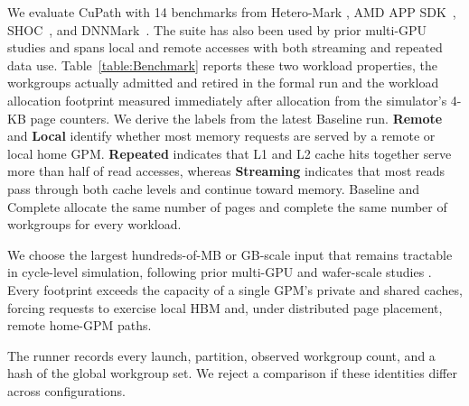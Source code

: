 We evaluate CuPath with 14 benchmarks from Hetero-Mark
\cite{sun2016hetero}, AMD APP SDK~\cite{amd_opencl_guide},
SHOC~\cite{danalis2010scalable}, and DNNMark~\cite{dong2017dnnmark}.
The suite has also been used by prior multi-GPU studies
\cite{wang2025oasis,li2023idyll,li2021improving,feng2024barre} and spans
local and remote accesses with both streaming and repeated data use.
Table~\ref{table:Benchmark} reports these two workload properties, the
workgroups actually admitted and retired in the formal run and the workload
allocation footprint measured immediately after allocation from the
simulator's 4-KB page counters.  We derive the labels from the latest Baseline
run.  \textbf{Remote} and \textbf{Local} identify whether most memory requests
are served by a remote or local home GPM.  \textbf{Repeated} indicates that L1
and L2 cache hits together serve more than half of read accesses, whereas
\textbf{Streaming} indicates that most reads pass through both cache levels
and continue toward memory.  Baseline and Complete allocate the same number of
pages and complete the same number of workgroups for every workload.

We choose the largest hundreds-of-MB or GB-scale input that remains tractable
in cycle-level simulation, following prior multi-GPU and wafer-scale studies
\cite{baruah2020griffin,li2023trans,xu2025exploring}.  Every footprint exceeds
the capacity of a single GPM's private and shared caches, forcing requests to
exercise local HBM and, under distributed page placement, remote home-GPM paths.

The runner records every launch, partition, observed workgroup count, and a
hash of the global workgroup set.  We reject a comparison if these identities
differ across configurations.

